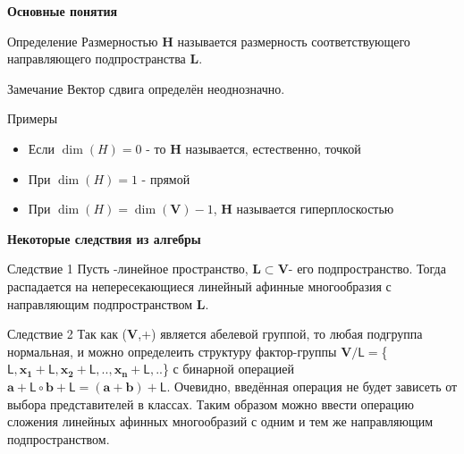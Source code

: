 \documentclass{beamer}
\begin{document}
\begin{frame}{\textbf{Основные понятия}}

\begin{block}{Определение}
Размерностью $\mathbf{H}$ называется размерность соответствующего направляющего подпространства $\mathbf{L}$.
\end{block}
\begin{block}{Замечание}
Вектор сдвига определён неоднозначно.
\end{block}
\begin{block}{Примеры}

\begin{itemize}
\item Если $\dim(H)=0$ - то $\mathbf{H}$ называется, естественно, точкой 
\item При $\dim(H)=1$ - прямой
\item При $\dim(H)=\dim(\mathbf{V})-1$, $\mathbf{H}$ называется гиперплоскостью
\end{itemize}

\end{block}

\end{frame}



\begin{frame}{\textbf{Некоторые следствия из алгебры}}


\begin{block}{Следствие 1}
Пусть -линейное пространство, $\mathbf{L}\subset \mathbf{V}$- его подпространство. Тогда  распадается на непересекающиеся линейный афинные многообразия с направляющим подпространством $\mathbf{L}$.
\end{block}


\begin{block}{Следствие 2}
 Так как ($\mathbf{V}$,+) является абелевой группой, то любая подгруппа нормальная, и можно определеить структуру фактор-группы
 $\mathbf{V}/\mathsf{L}=$\{$\mathsf{L},\mathbf{x_1}+\mathsf{L},\mathbf{x_2}+\mathsf{L},..,\mathbf{x_n}+\mathsf{L},..$\} с бинарной операцией $\mathbf{a}+\mathsf{L}\circ \mathbf{b}+\mathsf{L}=(\mathbf{a}+\mathbf{b})+\mathsf{L}$. Очевидно, введённая операция не будет зависеть от выбора представителей в классах. Таким образом можно ввести операцию сложения линейных афинных многообразий с одним и тем же направляющим подпространством.
\end{block}


\end{frame}
\end{document}
